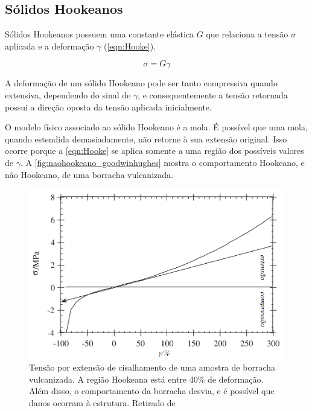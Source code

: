 			\subsection{Sólidos Hookeanos}
			
			Sólidos Hookeanos possuem uma constante elástica \(G\) que relaciona a tensão \(\sigma\) aplicada e a deformação \(\gamma\) (\autoref{eqn:Hooke})\cite{Goodwin2008}. 
			
			\begin{equation} 
				\sigma = G\gamma
				\label{eqn:Hooke}
			\end{equation} 
			
			A deformação de um sólido Hookeano pode ser tanto compressiva quando extensiva, dependendo do sinal de \(\gamma\), e consequentemente a tensão retornada possui a direção oposta da tensão aplicada inicialmente. 
			
			O modelo físico associado ao sólido Hookeano é a mola.\cite{Goodwin2008} É possível que uma mola, quando estendida demasiadamente, não retorne à sua extensão original. Isso ocorre porque a \autoref{eqn:Hooke} se aplica somente a uma região dos possíveis valores de \(\gamma\). A \autoref{fig:naohookeano_goodwinhughes} mostra o comportamento Hookeano, e não Hookeano, de uma borracha vulcanizada.
					
			\begin{figure}
				\centering
				\includegraphics[width=0.7\linewidth]{imagens/artigos/nao_hookeano_goodwin_hughes}
				\caption{Tensão por extensão de cisalhamento de uma amostra de borracha vulcanizada. A região Hookeana está entre 40\% de deformação. Além disso, o comportamento da borracha desvia, e é possível que danos ocorram à estrutura. Retirado de \citeauthor{Goodwin2008}}
				\label{fig:naohookeano_goodwinhughes}
			\end{figure}

